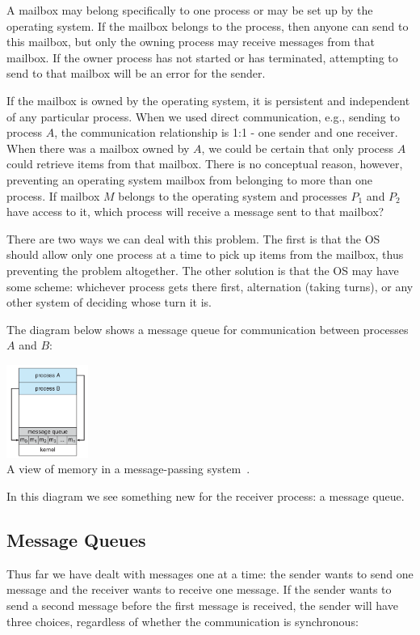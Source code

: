 \documentclass[a4paper]{report}
\begin{document}
A mailbox may belong specifically to one process or may be set up by the operating system. If the mailbox belongs to the process, then anyone can send to this mailbox, but only the owning process may receive messages from that mailbox. If the owner process has not started or has terminated, attempting to send to that mailbox will be an error for the sender.

If the mailbox is owned by the operating system, it is persistent and independent of any particular process. When we used direct communication, e.g., sending to process $A$, the communication relationship is 1:1 - one sender and one receiver. When there was a mailbox owned by $A$, we could be certain that only process $A$ could retrieve items from that mailbox. There is no conceptual reason, however, preventing an operating system mailbox from belonging to more than one process. If mailbox $M$ belongs to the operating system and processes $P_{1}$ and $P_{2}$ have access to it, which process will receive a message sent to that mailbox?

There are two ways we can deal with this problem. The first is that the OS should allow only one process at a time to pick up items from the mailbox, thus preventing the problem altogether. The other solution is that the OS may have some scheme: whichever process gets there first, alternation (taking turns), or any other system of deciding whose turn it is.

The diagram below shows a message queue for communication between processes $A$ and $B$:
\begin{center}
	\includegraphics[width=0.2\textwidth]{images/message-passing.png}\\
	A view of memory in a message-passing system~\cite{osc}.
\end{center}

In this diagram we see something new for the receiver process: a message queue.

\subsection*{Message Queues}

Thus far we have dealt with messages one at a time: the sender wants to send one message and the receiver wants to receive one message. If the sender wants to send a second message before the first message is received, the sender will have three choices, regardless of whether the communication is synchronous:
\end{document}
